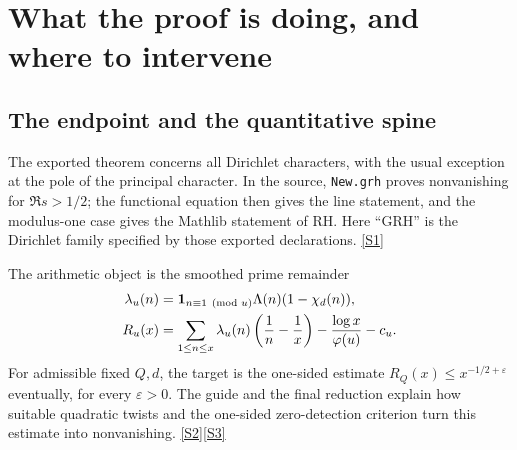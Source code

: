 \documentclass[11pt,letterpaper]{article}
\theoremstyle{remark}
\newcommand{\code}[1]{{\small\nolinkurl{#1}}}
\newcommand{\src}[1]{\hyperref[src:#1]{[S#1]}}
\begin{document}
\clearpage
\thispagestyle{plain}
\tableofcontents
\newpage

\section{What the proof is doing, and where to intervene}
\label{sec:architecture}

\subsection{The endpoint and the quantitative spine}

The exported theorem concerns all Dirichlet characters, with the usual exception
at the pole of the principal character. In the source, \code{New.grh} proves
nonvanishing for \(\Re s>1/2\); the functional equation then gives the line statement,
and the modulus-one case gives the Mathlib statement of RH. Here ``GRH'' is the
Dirichlet family specified by those exported declarations. \src{1}

The arithmetic object is the smoothed prime remainder
\begin{align}
 \lambda_u(n)&=\mathbf 1_{n\equiv1\pmod u}\Lambda(n)(1-\chi_d(n)),\notag\\
 R_u(x)&=\sum_{1\le n\le x}\lambda_u(n)\left(\frac1n-\frac1x\right)
       -\frac{\log x}{\varphi(u)}-c_u. \label{eq:remainder}
\end{align}
For admissible fixed \(Q,d\), the target is the one-sided estimate
\(R_Q(x)\le x^{-1/2+\varepsilon}\) eventually, for every \(\varepsilon>0\).
The guide and the final reduction explain how suitable quadratic twists and the
one-sided zero-detection criterion turn this estimate into nonvanishing. \src{2}\src{3}
\end{document}
